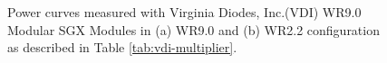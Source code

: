 \begin{figure}[!htb]
    \hfill
    \hfill

    \caption{Power curves measured with Virginia Diodes, Inc.(VDI) WR9.0 Modular SGX Modules in (a) WR9.0 and (b) WR2.2 configuration as described in Table \ref{tab:vdi-multiplier}.}
    \label{fig:power-curves}
\end{figure}

